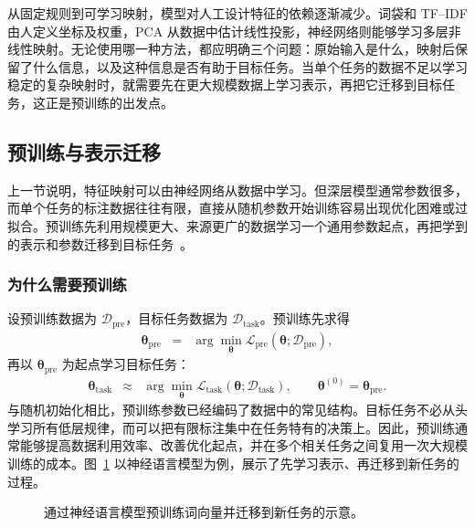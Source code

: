 从固定规则到可学习映射，模型对人工设计特征的依赖逐渐减少。词袋和 TF--IDF 由人定义坐标及权重，PCA 从数据中估计线性投影，神经网络则能够学习多层非线性映射。无论使用哪一种方法，都应明确三个问题：原始输入是什么，映射后保留了什么信息，以及这种信息是否有助于目标任务。当单个任务的数据不足以学习稳定的复杂映射时，就需要先在更大规模数据上学习表示，再把它迁移到目标任务，这正是预训练的出发点。

\subsection{预训练与表示迁移}

上一节说明，特征映射可以由神经网络从数据中学习。但深层模型通常参数很多，而单个任务的标注数据往往有限，直接从随机参数开始训练容易出现优化困难或过拟合。预训练先利用规模更大、来源更广的数据学习一个通用参数起点，再把学到的表示和参数迁移到目标任务~\cite{bengio-etal:2006greedy,erhan-etal:2010does,PanYang2010Transfer}。

\subsubsection{为什么需要预训练}

设预训练数据为 $\mathcal{D}_{\mathrm{pre}}$，目标任务数据为 $\mathcal{D}_{\mathrm{task}}$。预训练先求得
\begin{eqnarray}
\boldsymbol{\theta}_{\mathrm{pre}}
& = &
\arg\min_{\boldsymbol{\theta}}
\mathcal{L}_{\mathrm{pre}}
(\boldsymbol{\theta};\mathcal{D}_{\mathrm{pre}}),
\end{eqnarray}
再以 $\boldsymbol{\theta}_{\mathrm{pre}}$ 为起点学习目标任务：
\begin{eqnarray}
\boldsymbol{\theta}_{\mathrm{task}}
& \approx &
\arg\min_{\boldsymbol{\theta}}
\mathcal{L}_{\mathrm{task}}
(\boldsymbol{\theta};\mathcal{D}_{\mathrm{task}}),
\qquad
\boldsymbol{\theta}^{(0)}=\boldsymbol{\theta}_{\mathrm{pre}}.
\end{eqnarray}
与随机初始化相比，预训练参数已经编码了数据中的常见结构。目标任务不必从头学习所有低层规律，而可以把有限标注集中在任务特有的决策上。因此，预训练通常能够提高数据利用效率、改善优化起点，并在多个相关任务之间复用一次大规模训练的成本。图~\ref{fig:nlpbook-pretraining-embedding-via-nlm} 以神经语言模型为例，展示了先学习表示、再迁移到新任务的过程。

\begin{figure}[htbp]
  \centering
  
  \caption{通过神经语言模型预训练词向量并迁移到新任务的示意。}
  \label{fig:nlpbook-pretraining-embedding-via-nlm}
\end{figure}

